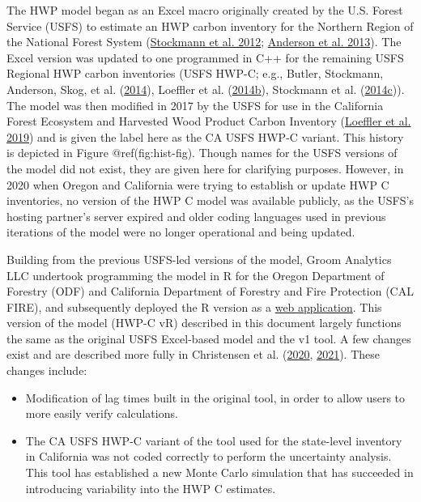 \documentclass[
  openany]{book}
\providecommand{\tightlist}{%
  \setlength{\itemsep}{0pt}\setlength{\parskip}{0pt}}
\begin{document}
The HWP model began as an Excel macro originally created by the U.S.
Forest Service (USFS) to estimate an HWP carbon inventory for the
Northern Region of the National Forest System
(\protect\hyperlink{ref-stockmann2012}{Stockmann et al. 2012};
\protect\hyperlink{ref-anderson2013}{Anderson et al. 2013}). The Excel
version was updated to one programmed in C++ for the remaining USFS
Regional HWP carbon inventories (USFS HWP-C; e.g., Butler, Stockmann,
Anderson, Skog, et al. (\protect\hyperlink{ref-butler2014nw}{2014}),
Loeffler et al. (\protect\hyperlink{ref-loeffler2014sr}{2014b}),
Stockmann et al. (\protect\hyperlink{ref-stockmann2014imr}{2014c})). The
model was then modified in 2017 by the USFS for use in the California
Forest Ecosystem and Harvested Wood Product Carbon Inventory
(\protect\hyperlink{ref-loeffler2019}{Loeffler et al. 2019}) and is
given the label here as the CA USFS HWP-C variant. This history is
depicted in Figure @ref(fig:hist-fig). Though names for the USFS
versions of the model did not exist, they are given here for clarifying
purposes. However, in 2020 when Oregon and California were trying to
establish or update HWP C inventories, no version of the HWP C model was
available publicly, as the USFS's hosting partner's server expired and
older coding languages used in previous iterations of the model were no
longer operational and being updated.

Building from the previous USFS-led versions of the model, Groom
Analytics LLC undertook programming the model in R for the Oregon
Department of Forestry (ODF) and California Department of Forestry and
Fire Protection (CAL FIRE), and subsequently deployed the R version as a
\href{https://groomanalyticsllc.shinyapps.io/HWP-C-vR/}{web
application}. This version of the model (HWP-C vR) described in this
document largely functions the same as the original USFS Excel-based
model and the v1 tool. A few changes exist and are described more fully
in Christensen et al. (\protect\hyperlink{ref-christensen2020}{2020},
\protect\hyperlink{ref-christensen2021}{2021}). These changes include:

\begin{itemize}
\tightlist
\item
  Modification of lag times built in the original tool, in order to
  allow users to more easily verify calculations.\\
\item
  The CA USFS HWP-C variant of the tool used for the state-level
  inventory in California was not coded correctly to perform the
  uncertainty analysis. This tool has established a new Monte Carlo
  simulation that has succeeded in introducing variability into the HWP
  C estimates.
\end{itemize}
\end{document}
